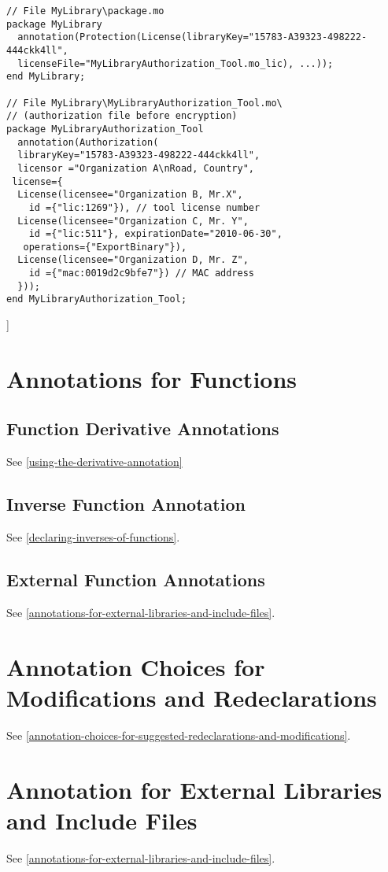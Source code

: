 \begin{lstlisting}[language=modelica]
// File MyLibrary\package.mo
package MyLibrary
  annotation(Protection(License(libraryKey="15783-A39323-498222-444ckk4ll",
  licenseFile="MyLibraryAuthorization_Tool.mo_lic), ...));
end MyLibrary;

// File MyLibrary\MyLibraryAuthorization_Tool.mo\
// (authorization file before encryption)
package MyLibraryAuthorization_Tool
  annotation(Authorization(
  libraryKey="15783-A39323-498222-444ckk4ll",
  licensor ="Organization A\nRoad, Country",
 license={
  License(licensee="Organization B, Mr.X",
    id ={"lic:1269"}), // tool license number
  License(licensee="Organization C, Mr. Y",
    id ={"lic:511"}, expirationDate="2010-06-30",
   operations={"ExportBinary"}),
  License(licensee="Organization D, Mr. Z",
    id ={"mac:0019d2c9bfe7"}) // MAC address
  }));
end MyLibraryAuthorization_Tool;
\end{lstlisting}
{]}

\section{Annotations for Functions}

\subsection{Function Derivative Annotations}

See \autoref{using-the-derivative-annotation}

\subsection{Inverse Function Annotation}

See \autoref{declaring-inverses-of-functions}.

\subsection{External Function Annotations}

See \autoref{annotations-for-external-libraries-and-include-files}.

\section{Annotation Choices for Modifications and Redeclarations}

See \autoref{annotation-choices-for-suggested-redeclarations-and-modifications}.

\section{Annotation for External Libraries and Include Files}

See \autoref{annotations-for-external-libraries-and-include-files}.
